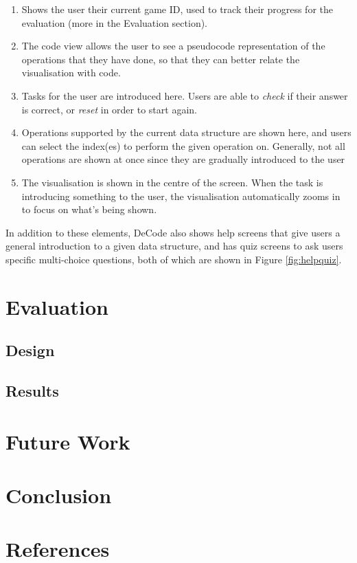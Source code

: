 \documentclass[10pt]{article}
\begin{document}
\begin{enumerate}
  \item Shows the user their current game ID, used to track their progress for the evaluation (more in the Evaluation section).
  \item The code view allows the user to see a pseudocode representation of the operations that they have done, so that they can better relate the visualisation with code.
  \item Tasks for the user are introduced here. Users are able to \emph{check} if their answer is correct, or \emph{reset} in order to start again.
  \item Operations supported by the current data structure are shown here, and users can select the index(es) to perform the given operation on. Generally, not all operations are shown at once since they are gradually introduced to the user
  \item The visualisation is shown in the centre of the screen. When the task is introducing something to the user, the visualisation automatically zooms in to focus on what's being shown.
\end{enumerate}
In addition to these elements, DeCode also shows help screens that give users a general introduction to a given data structure, and has quiz screens to ask users specific multi-choice questions, both of which are shown in Figure \ref{fig:helpquiz}.
\section{Evaluation}
\subsection{Design}
\subsection{Results}
\section{Future Work}
\section{Conclusion}

\begingroup

\section*{References}
  \vspace{2mm}

  \renewcommand{\section}[2]{}

  \begin{spacing}{1.0}

    
    \small
    

  \end{spacing}

\endgroup
\end{document}
